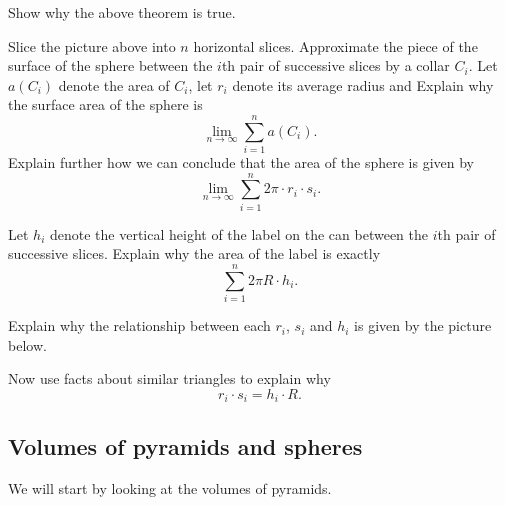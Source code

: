 \documentclass[newpage,hints,handout,noauthor,nooutcomes,12pt]{ximera}
\begin{document}
\begin{problem}
Show why the above theorem is true.

\begin{hint}
Slice the picture above into $n$ horizontal slices. Approximate the
piece of the surface of the sphere between the $i$th pair of
successive slices by a collar $C_{i}$. Let $a\left( C_{i}\right) $
denote the area of $C_{i}$, let $r_{i}$ denote its average radius and
Explain why the surface area of the sphere is
\[
\lim_{n\to \infty}\sum_{i=1}^{n} a(C_i).
\]
Explain further how we can conclude that the area of the sphere is
given by
\[%
\lim_{n\to \infty}\sum_{i=1}^{n} 2\pi\cdot r_{i}\cdot s_{i}.
\]

\end{hint}
\begin{hint}
Let $h_{i}$ denote the vertical height of the label on the can between
the $i$th pair of successive slices. Explain why the area of the label is exactly%
\[%
\sum_{i=1}^{n} 2\pi R \cdot h_{i}.
\]
\end{hint}
\begin{hint}
Explain why the relationship between each $r_{i}$, $s_{i}$ and $h_{i}$
is given by the picture below.
\begin{image}
\end{image}
Now use facts about similar triangles to explain why
\[
r_{i}\cdot s_{i}=h_{i}\cdot R.
\]
\end{hint}
\end{problem}




\subsection{Volumes of pyramids and spheres}

We will start by looking at the volumes of pyramids.
\end{document}
